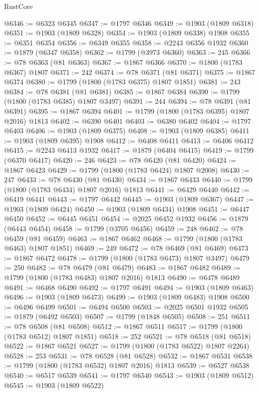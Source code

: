 \begin{lexlean}{RustCore}
\begin{coremodule}
@6346 := @6323 @6345
@6347 := @1797 @6346
@6349 := @1903 (@1809 @6318)
@6351 := @1903 (@1809 @6328)
@6354 := @1903 (@1809 @6338) @1908
@6355 := @6351 @6354
@6356 := @6349 @6355
@6358 := @2243 @6356 @1932
@6360 := @1879 (@6347 @6358)
@6362 := @1799 (@3973 @6360)
@6363 := 245
@6366 := @78 @6363 (@81 @6363)
@6367 := @1867 @6366
@6370 := @1800 (@1783 @6367) @1807
@6371 := 242
@6374 := @78 @6371 (@81 @6371)
@6375 := @1867 @6374
@6380 := @1799 (@1800 (@1783 @6375) @1807 @1851)
@6381 := 243
@6384 := @78 @6381 (@81 @6381)
@6385 := @1867 @6384
@6390 := @1799 (@1800 (@1783 @6385) @1807 @3497)
@6391 := 244
@6394 := @78 @6391 (@81 @6391)
@6395 := @1867 @6394
@6401 := @1799 (@1800 (@1783 @6395) @1807 @2016) @1813
@6402 := @6390 @6401
@6403 := @6380 @6402
@6404 := @1797 @6403
@6406 := @1903 (@1809 @6375)
@6408 := @1903 (@1809 @6385)
@6411 := @1903 (@1809 @6395) @1908
@6412 := @6408 @6411
@6413 := @6406 @6412
@6415 := @2243 @6413 @1932
@6417 := @1879 (@6404 @6415)
@6419 := @1799 (@6370 @6417)
@6420 := 246
@6423 := @78 @6420 (@81 @6420)
@6424 := @1867 @6423
@6429 := @1799 (@1800 (@1783 @6424) @1807 @2008)
@6430 := 247
@6433 := @78 @6430 (@81 @6430)
@6434 := @1867 @6433
@6440 := @1799 (@1800 (@1783 @6434) @1807 @2016) @1813
@6441 := @6429 @6440
@6442 := @6419 @6441
@6443 := @1797 @6442
@6445 := @1903 (@1809 @6367)
@6447 := @1903 (@1809 @6424)
@6450 := @1903 (@1809 @6434) @1908
@6451 := @6447 @6450
@6452 := @6445 @6451
@6454 := @2025 @6452 @1932
@6456 := @1879 (@6443 @6454)
@6458 := @1799 (@3705 @6456)
@6459 := 248
@6462 := @78 @6459 (@81 @6459)
@6463 := @1867 @6462
@6468 := @1799 (@1800 (@1783 @6463) @1807 @1851)
@6469 := 249
@6472 := @78 @6469 (@81 @6469)
@6473 := @1867 @6472
@6478 := @1799 (@1800 (@1783 @6473) @1807 @3497)
@6479 := 250
@6482 := @78 @6479 (@81 @6479)
@6483 := @1867 @6482
@6489 := @1799 (@1800 (@1783 @6483) @1807 @2016) @1813
@6490 := @6478 @6489
@6491 := @6468 @6490
@6492 := @1797 @6491
@6494 := @1903 (@1809 @6463)
@6496 := @1903 (@1809 @6473)
@6499 := @1903 (@1809 @6483) @1908
@6500 := @6496 @6499
@6501 := @6494 @6500
@6503 := @2025 @6501 @1932
@6505 := @1879 (@6492 @6503)
@6507 := @1799 (@1848 @6505)
@6508 := 251
@6511 := @78 @6508 (@81 @6508)
@6512 := @1867 @6511
@6517 := @1799 (@1800 (@1783 @6512) @1807 @1851)
@6518 := 252
@6521 := @78 @6518 (@81 @6518)
@6522 := @1867 @6521
@6527 := @1799 (@1800 (@1783 @6522) @1807 @2264)
@6528 := 253
@6531 := @78 @6528 (@81 @6528)
@6532 := @1867 @6531
@6538 := @1799 (@1800 (@1783 @6532) @1807 @2016) @1813
@6539 := @6527 @6538
@6540 := @6517 @6539
@6541 := @1797 @6540
@6543 := @1903 (@1809 @6512)
@6545 := @1903 (@1809 @6522)

\end{coremodule}
\end{lexlean}
